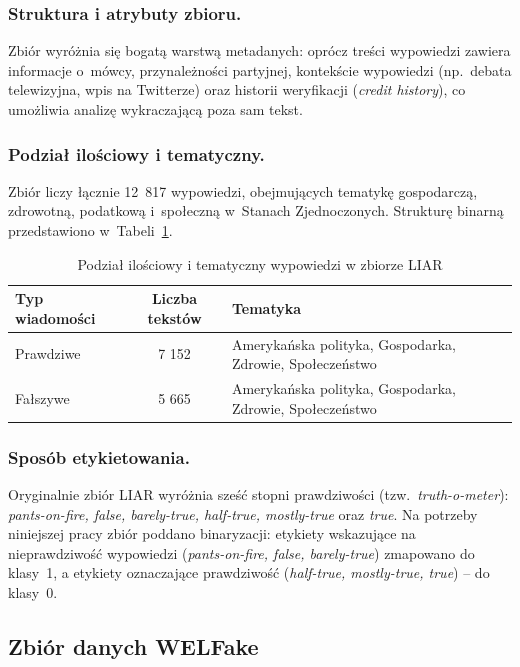 \documentclass[oneside,polski,logo]{amuthesis}
\begin{document}
\subsubsection{Struktura i atrybuty zbioru.} 
Zbiór wyróżnia się bogatą warstwą metadanych: oprócz treści wypowiedzi zawiera informacje o~mówcy, przynależności partyjnej, kontekście wypowiedzi (np.\ debata telewizyjna, wpis na Twitterze) oraz historii weryfikacji (\textit{credit history}), co umożliwia analizę wykraczającą poza sam tekst.

\subsubsection{Podział ilościowy i tematyczny.} 
Zbiór liczy łącznie 12~817 wypowiedzi, obejmujących tematykę gospodarczą, zdrowotną, podatkową i~społeczną w~Stanach Zjednoczonych. Strukturę binarną przedstawiono w~Tabeli~\ref{tab:liar_stat}.

\begin{table}[htbp]
\centering
\caption{Podział ilościowy i tematyczny wypowiedzi w zbiorze LIAR}
\vspace{0.2cm}
\begin{tabularx}{\textwidth}{l c X}
\toprule
\textbf{Typ wiadomości} & \textbf{Liczba tekstów} & \textbf{Tematyka} \\
\midrule
Prawdziwe & 7 152 & Amerykańska polityka, Gospodarka, Zdrowie, Społeczeństwo \\
Fałszywe & 5 665 & Amerykańska polityka, Gospodarka, Zdrowie, Społeczeństwo \\
\bottomrule
\end{tabularx}
\label{tab:liar_stat}
\end{table}

\subsubsection{Sposób etykietowania.}
\label{sec:liar_label}
Oryginalnie zbiór LIAR wyróżnia sześć stopni prawdziwości (tzw.\ \textit{truth-o-meter}): \textit{pants-on-fire, false, barely-true, half-true, mostly-true} oraz \textit{true}. Na potrzeby niniejszej pracy zbiór poddano binaryzacji: etykiety wskazujące na nieprawdziwość wypowiedzi (\textit{pants-on-fire, false, barely-true}) zmapowano do klasy~1, a etykiety oznaczające prawdziwość (\textit{half-true, mostly-true, true}) -- do klasy~0.

\subsection{Zbiór danych WELFake}
\end{document}
